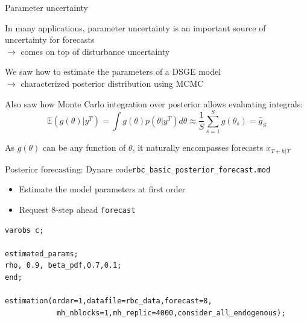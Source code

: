 \documentclass[handout,usepdftitle=false,xcolor=dvipsnames,aspectratio=169]{beamer}
\begin{document}
\begin{frame}{Parameter uncertainty}
  \begin{witemize}
    \item In many applications, parameter uncertainty is an important source of uncertainty for forecasts\\
    $\rightarrow$ comes on top of disturbance uncertainty
    \item We saw how to estimate the parameters of a DSGE model\\
    $\rightarrow$ characterized posterior distribution using MCMC
    \item Also saw how Monte Carlo integration over posterior allows evaluating integrals:
    \begin{equation}
      \mathbb{E}\left( {g\left( \theta  \right)|{y^T}} \right) = \int {g\left( \theta  \right)p\left( {\theta |{y^T}} \right)d\theta }  \approx \frac{1}{S}\sum\limits_{s = 1}^S {g\left( {{\theta _s}} \right)} =\hat g_S
    \end{equation}
    \item As $g(\theta)$ can be any function of $\theta$, it naturally encompasses forecasts $x_{T+h|T}$
  \end{witemize}
\end{frame}

\begin{frame}[fragile]{Posterior forecasting: Dynare code}{\texttt{rbc\_basic\_posterior\_forecast.mod}}
  \begin{itemize}
    \item Estimate the model parameters at first order
    \item Request $8$-step ahead \texttt{forecast}
  \end{itemize}
  \small
  \begin{verbatim}
varobs c;

estimated_params;
rho, 0.9, beta_pdf,0.7,0.1;
end;

estimation(order=1,datafile=rbc_data,forecast=8,
            mh_nblocks=1,mh_replic=4000,consider_all_endogenous);
\end{verbatim}
\end{frame}
\end{document}
